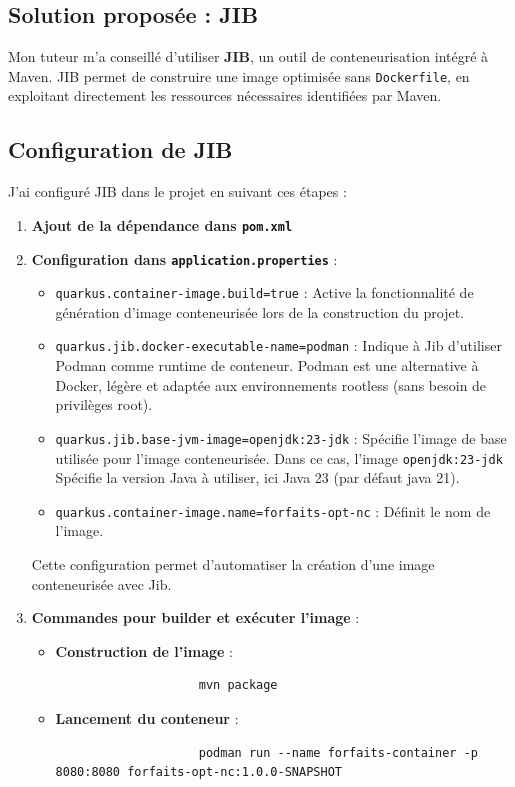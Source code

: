 \documentclass[11pt]{article}
\begin{document}
		\subsection*{Solution proposée : JIB}
		
		Mon tuteur m'a conseillé d'utiliser \textbf{JIB}, un outil de conteneurisation intégré à Maven. JIB permet de construire une image optimisée sans \texttt{Dockerfile}, en exploitant directement les ressources nécessaires identifiées par Maven.
		
		\subsection*{Configuration de JIB}
		
		J'ai configuré JIB dans le projet en suivant ces étapes :
		\begin{enumerate}
			\item \textbf{Ajout de la dépendance dans \texttt{pom.xml}}
			\item \textbf{Configuration dans \texttt{application.properties}} :	
			
			\begin{itemize}
				\item \texttt{quarkus.container-image.build=true} : Active la fonctionnalité de génération d'image conteneurisée lors de la construction du projet.
				\item \texttt{quarkus.jib.docker-executable-name=podman} : Indique à Jib d'utiliser Podman comme runtime de conteneur. Podman est une alternative à Docker, légère et adaptée aux environnements rootless (sans besoin de privilèges root).
				\item \texttt{quarkus.jib.base-jvm-image=openjdk:23-jdk} : Spécifie l'image de base utilisée pour l'image conteneurisée. Dans ce cas, l'image \texttt{openjdk:23-jdk} Spécifie la version Java à utiliser, ici Java 23 (par défaut java 21).
				\item \texttt{quarkus.container-image.name=forfaits-opt-nc} : Définit le nom de l'image.
			\end{itemize}
	
			Cette configuration permet d'automatiser la création d'une image conteneurisée avec Jib.
			\item \textbf{Commandes pour builder et exécuter l'image} :
			\begin{itemize}
				\item \textbf{Construction de l'image} :
				\begin{verbatim}
					mvn package
				\end{verbatim}
				\item \textbf{Lancement du conteneur} :
				\begin{verbatim}
					podman run --name forfaits-container -p 8080:8080 forfaits-opt-nc:1.0.0-SNAPSHOT
				\end{verbatim}
			\end{itemize}
		\end{enumerate}
\end{document}
